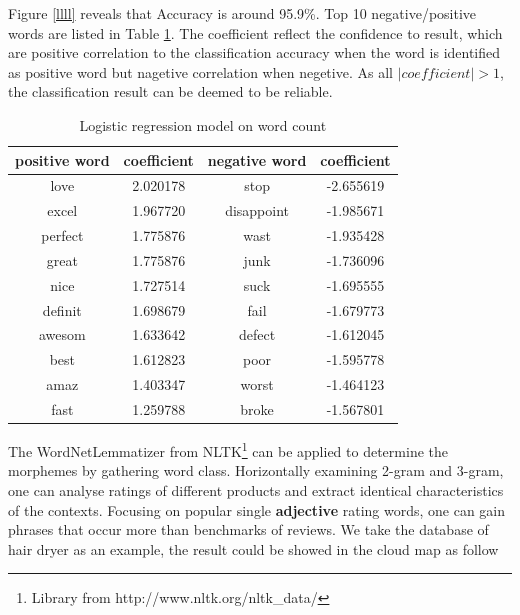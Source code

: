 \documentclass[12pt]{article}%
\begin{document}
 Figure \ref{llll} reveals that Accuracy is around 95.9\%. Top 10 negative/positive words are listed in Table \ref{biasso}. The coefficient reflect the confidence to result, which are positive correlation to the classification accuracy when the word is identified as positive word but nagetive correlation when negetive. As all $ \left | coefficient \right |>1 $, the classification result can be deemed to be reliable.


\begin{table}[H]
	\centering
	\caption{Logistic regression model on word count}	
	\begin{tabular}{cccc}
		\toprule[1.5pt]
		\multicolumn{1}{m{3cm}}{\centering positive word} & \multicolumn{1}{m{3cm}}{\centering coefficient}&
		\multicolumn{1}{m{3cm}}{\centering negative word}&
		\multicolumn{1}{m{3cm}}{\centering coefficient} \\
		\midrule[1pt]
		love     	 & 2.020178 & stop   &-2.655619\\
		excel     & 1.967720 &disappoint    &-1.985671\\
		perfect     &1.775876&wast    &-1.935428\\
		great          &1.775876&junk        &-1.736096\\
		 nice     &1.727514& suck    &-1.695555\\
		definit          & 1.698679& fail    &-1.679773\\
		awesom          &1.633642&defect        &-1.612045\\
		best        &1.612823&poor      &-1.595778\\
amaz        &1.403347&worst       &-1.464123\\
fast       &1.259788&broke          &-1.567801\\
		\bottomrule[1.6pt]
	\end{tabular}\label{biasso}
\end{table}
The WordNetLemmatizer from NLTK\footnote{\quad Library from http://www.nltk.org/nltk\_data/} can be applied to determine the morphemes by gathering word class. Horizontally examining 2-gram and 3-gram, one can analyse ratings of different products and extract identical characteristics of the contexts. Focusing on popular single \textbf{adjective} rating words, one can gain phrases that occur more than benchmarks of reviews. We take the database of hair dryer as an example, the result could be showed in the cloud map as follow
\end{document}
